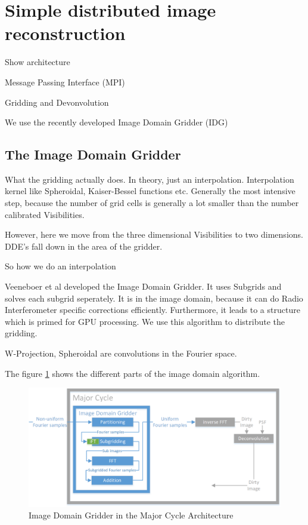 
\section{Simple distributed image reconstruction}\label{dist}
Show architecture

Message Passing Interface (MPI)


Gridding and Devonvolution

We use the recently developed Image Domain Gridder (IDG) 


\subsection{The Image Domain Gridder}\label{distribution:idg}

What the gridding actually does. In theory, just an interpolation. Interpolation kernel like Spheroidal, Kaiser-Bessel functions etc. Generally the most intensive step, because the number of grid cells is generally a lot smaller than the number calibrated Visibilities.

However, here we move from the three dimensional Visibilities to two dimensions. DDE's fall down in the area of the gridder.

So how we do an interpolation 

Veeneboer et al\cite{veenboer2017image} developed the Image Domain Gridder. It uses Subgrids and solves each subgrid seperately.
It is in the image domain, because it can do Radio Interferometer specific corrections efficiently. Furthermore, it leads to a structure which is primed for GPU processing.
We use this algorithm to distribute the gridding.

W-Projection, Spheroidal are convolutions in the Fourier space.

The figure \ref{distribution:idg:system} shows the different parts of the image domain algorithm.

\begin{figure}[h]
	\centering
	\includegraphics[width=0.80\linewidth]{./chapters/03.distribution/idg/major-minor-idg.png}
	\caption{Image Domain Gridder in the Major Cycle Architecture}
	\label{distribution:idg:system}
\end{figure}

